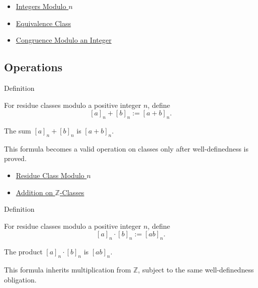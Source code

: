 \begin{dependencies}
\begin{itemize}
  \item \hyperref[def:integers-modulo-n]{Integers Modulo \(n\)}
  \item \hyperref[def:equiv-class]{Equivalence Class}
  \item \hyperref[def:congruence-modulo-integer]{Congruence Modulo an Integer}
\end{itemize}
\end{dependencies}

\subsection*{Operations}

\begin{definitionbox}{Definition}
\begin{definition}
\label{def:addition-modulo-n}
For residue classes modulo a positive integer \(n\), define
\[
[a]_n+[b]_n:=[a+b]_n.
\]
\end{definition}

\begin{remark*}
The sum \([a]_n+[b]_n\) is \([a+b]_n\).
\end{remark*}

\begin{remark*}[Interpretation]
This formula becomes a valid operation on classes only after well-definedness
is proved.
\end{remark*}
\end{definitionbox}

\begin{dependencies}
\begin{itemize}
  \item \hyperref[def:residue-class-modulo-n]{Residue Class Modulo \(n\)}
  \item \hyperref[def:addition-on-z-classes]{Addition on \(\mathbb{Z}\)-Classes}
\end{itemize}
\end{dependencies}

\begin{definitionbox}{Definition}
\begin{definition}
\label{def:multiplication-modulo-n}
For residue classes modulo a positive integer \(n\), define
\[
[a]_n\cdot[b]_n:=[ab]_n.
\]
\end{definition}

\begin{remark*}
The product \([a]_n\cdot[b]_n\) is \([ab]_n\).
\end{remark*}

\begin{remark*}[Interpretation]
This formula inherits multiplication from \(\mathbb{Z}\), subject to the same
well-definedness obligation.
\end{remark*}
\end{definitionbox}


